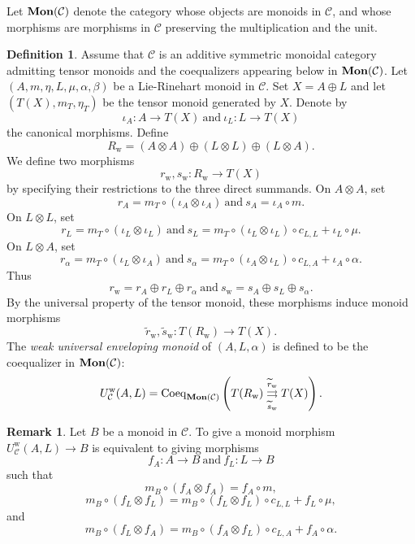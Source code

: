 \documentclass[11pt]{amsart}
\theoremstyle{definition}
\newtheorem{defi}[theo]{Definition}
\newtheorem{rmk}[theo]{Remark}
\numberwithin{equation}{section}
\begin{document}
Let ${\bf Mon}(\mathcal C)$ denote the category whose objects are monoids in $\mathcal C$, and whose morphisms are morphisms in $\mathcal C$ preserving
the multiplication and the unit.
\begin{defi}
Assume that $\mathcal C$ is an additive symmetric monoidal category admitting tensor monoids and the coequalizers appearing below in
${\bf Mon}(\mathcal C)$. 
Let $(A,m,\eta,L,\mu,\alpha,\beta)$
be a Lie-Rinehart monoid in $\mathcal C$. 
Set $X=A\oplus L$ and let $(T(X), m_T, \eta_T)$ be the tensor monoid generated by $X$. 
Denote by
\[
\iota_A:A\rightarrow T(X) \ \text{and} \ 
\iota_L:L\rightarrow T(X)
\]
the canonical morphisms.
Define
\[
R_{\mathrm w}=(A\otimes A)\oplus(L\otimes L)\oplus
(L\otimes A).
\]
We define two morphisms
\[
r_{\mathrm w},s_{\mathrm w}:R_{\mathrm w}\rightarrow T(X)
\]
by specifying their restrictions to the three direct summands.
On $A\otimes A$, set
\[r_A=m_T\circ(\iota_A\otimes\iota_A) \ \text{and} \  s_A=\iota_A\circ m.
\]
On $L\otimes L$, set
\[r_L=m_T\circ(\iota_L\otimes\iota_L) \ \text{and} \ s_L=
m_T\circ(\iota_L\otimes\iota_L)\circ c_{L,L}+\iota_L\circ\mu.
\]
On $L\otimes A$, set
\[r_{\alpha}=m_T\circ(\iota_L\otimes\iota_A) \ \text{and} \ s_{\alpha}=
m_T\circ(\iota_A\otimes\iota_L)\circ c_{L,A}+\iota_A\circ\alpha.
\]
Thus
\[
r_{\mathrm w}=r_A\oplus r_L\oplus r_{\alpha} \ \text{and} \ 
s_{\mathrm w}=s_A\oplus s_L\oplus s_{\alpha}.
\]
By the universal property of the tensor monoid, these morphisms induce
monoid morphisms
\[
\widetilde r_{\mathrm w},\widetilde s_{\mathrm w}:
T(R_{\mathrm w})\rightarrow T(X).
\]
The \emph{weak universal enveloping monoid} of $(A,L,\alpha)$ is defined to
be the coequalizer in ${\bf Mon}(\mathcal C)$:
\[
U^{\mathrm w}_{\mathcal C}(A,L)
=
\operatorname{Coeq}_{{\bf Mon}(\mathcal C)}
\left(
T(R_{\mathrm w})
\overset{\widetilde r_{\mathrm w}}{\underset{\widetilde s_{\mathrm w}}{\rightrightarrows}}T(X)\right).
\]
\end{defi}

\begin{rmk}
Let $B$ be a monoid in $\mathcal C$. To give a monoid morphism $U^{\mathrm w}_{\mathcal C}(A,L)\rightarrow B$
is equivalent to giving morphisms
\[
f_A:A\rightarrow B \ \text{and} \ 
f_L:L\rightarrow B
\]
such that
\[
m_B\circ(f_A\otimes f_A)=f_A\circ m,
\]
\[
m_B\circ(f_L\otimes f_L)=
m_B\circ(f_L\otimes f_L)\circ c_{L,L}
+f_L\circ \mu,
\]
and
\[
m_B\circ(f_L\otimes f_A)=
m_B\circ(f_A\otimes f_L)\circ c_{L,A}
+f_A\circ \alpha.
\]
\end{rmk}
\end{document}
